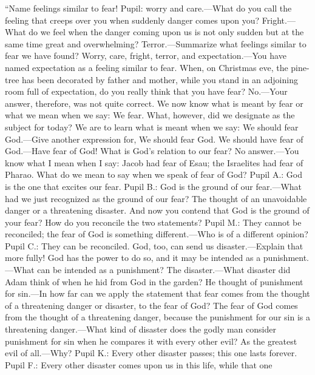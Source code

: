 “Name feelings similar to fear! Pupil: worry and care.—What do you call the feeling that creeps over you when suddenly danger comes upon you? Fright.—What do we feel when the danger coming upon us is not only sudden but at the same time great and overwhelming? Terror.—Summarize what feelings similar to fear we have found? Worry, care, fright, terror, and expectation.—You have named expectation as a feeling similar to fear. When, on Christmas eve, the pine-tree has been decorated by father and mother, while you stand in an adjoining room full of expectation, do you really think that you have fear? No.—Your answer, therefore, was not quite correct. We now know what is meant by fear or what we mean when we say: We fear. What, however, did we designate as the subject for today? We are to learn what is meant when we say: We should fear God.—Give another expression for, We should fear God. We should have fear of God.—Have fear of God! What is God’s relation to our fear? No answer.—You know what I mean when I say: Jacob had fear of Esau; the Israelites had fear of Pharao. What do we mean to say when we speak of fear of God? Pupil A.: God is the one that excites our fear. Pupil B.: God is the ground of our fear.—What had we just recognized as the ground of our fear? The thought of an unavoidable danger or a threatening disaster. And now you contend that God is the ground of your fear? How do you reconcile the two statements? Pupil M.: They cannot be reconciled; the fear of God is something different.—Who is of a different opinion? Pupil C.: They can be reconciled. God, too, can send us disaster.—Explain that more fully! God has the power to do so, and it may be intended as a punishment.—What can be intended as a punishment? The disaster.—What disaster did Adam think of when he hid from God in the garden? He thought of punishment for sin.—In how far can we apply the statement that fear comes from the thought of a threatening danger or disaster, to the fear of God? The fear of God comes from the thought of a threatening danger, because the punishment for our sin is a threatening danger.—What kind of disaster does the godly man consider punishment for sin when he compares it with every other evil? As the greatest evil of all.—Why? Pupil K.: Every other disaster passes; this one lasts forever. Pupil F.: Every other disaster comes upon us in this life, while that one
